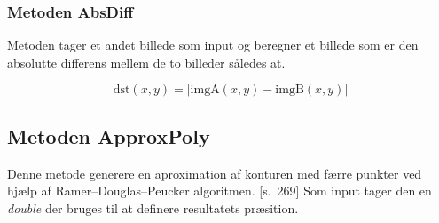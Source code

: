 \subsubsection{Metoden AbsDiff}
Metoden tager et andet billede som input og beregner et billede
som er den absolutte differens mellem de to billeder således at.
\cite{EmguCVLibDoc}

$$ \text{dst}(x,y) = \vert \text{imgA}(x,y) - \text{imgB}(x,y) \vert $$

\subsection{Metoden ApproxPoly}
Denne metode generere en aproximation af konturen med færre punkter ved hjælp af Ramer–Douglas–Peucker algoritmen.
\cite{opencvrefman}[s.~269]
Som input tager den en \emph{double} der bruges til at definere resultatets præsition.
\cite{EmguCVLibDoc}
